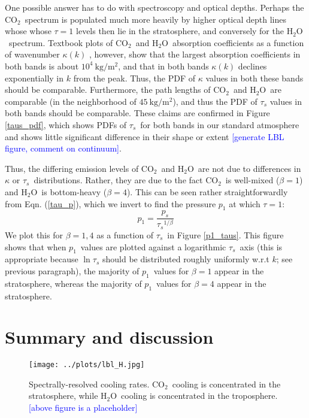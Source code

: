 \documentclass[10pt]{article}
\newcommand{\comment}[1]{\textcolor{blue}{[{#1}]}}
\newcommand{\beqn}{\begin{equation}}
\newcommand{\eeqn}{\end{equation}}
\newcommand{\eqnref}[1]{(\ref{#1})}
\newcommand{\cotwo}{\ensuremath{\mathrm{CO_2}}}
\newcommand{\htwo}{\ensuremath{\mathrm{H_2O}}}
\newcommand{\pem}{\ensuremath{p_1}}
\newcommand{\taus}{\ensuremath{\tau_s}}
\newcommand{\ps}{\ensuremath{p_s}}
\begin{document}
One possible answer has to do with spectroscopy and optical depths. Perhaps the \cotwo\ spectrum is populated  much more heavily by higher optical depth lines whose  whose $\tau=1$ levels then lie in the stratosphere, and conversely for the \htwo\ spectrum.  Textbook plots of \cotwo\ and \htwo\ absorption coefficients as a function of wavenumber $\kappa(k)$ \citep{pierrehumbert2010}, however, show that the largest absorption coefficients in both bands is about $10^4\ \mathrm{kg/m^2}$, and that in both  bands $\kappa(k)$ declines exponentially in $k$ from the peak. Thus, the PDF of $\kappa$ values in both these bands should be comparable. Furthermore, the path lengths of \cotwo\ and \htwo\ are comparable (in the neighborhood of $45\ \mathrm{kg/m^2}$), and thus the PDF of $\taus$ values in both bands should be comparable. These claims are confirmed in Figure \ref{taus_pdf}, which shows PDFs of \taus\ for both bands in our standard atmosphere and shows little significant difference in their shape or extent \comment{generate LBL figure, comment on continuum}.

Thus, the differing emission levels of \cotwo\ and \htwo\ are not due to differences in $\kappa$ or \taus\ distributions. Rather, they are due to the fact \cotwo\ is well-mixed ($\beta=1$) and \htwo\ is bottom-heavy ($\beta=4$). This can be seen rather straightforwardly from Eqn. \eqnref{tau_p}, which we invert to find the pressure $\pem$ at which $\tau=1$:
	\beqn
		\pem = \frac{\ps}{\taus^{1/\beta}}
	\eeqn
We plot this for $\beta=1,4$ as a function of \taus\ in Figure \ref{p1_taus}. This figure shows that when \pem\ values are plotted against a logarithmic \taus\ axis (this is appropriate because $\ln \taus$ should be distributed roughly uniformly w.r.t $k$; see previous paragraph), the majority of \pem\ values for $\beta=1$ appear in the stratosphere, whereas the majority of \pem\ values for $\beta=4$ appear in the stratosphere. 

\section{Summary and discussion}

	
\pagebreak

\begin{figure}[h]
	\begin{center}
			\texttt{[image: ../plots/lbl\_H.jpg]}
		\caption{Spectrally-resolved cooling rates. \cotwo\ cooling is concentrated in the stratosphere, while \htwo\ cooling is concentrated in the troposphere. \comment{above figure is a placeholder}
		\label{lbl_H}
		}
	\end{center}
\end{figure}
\end{document}
